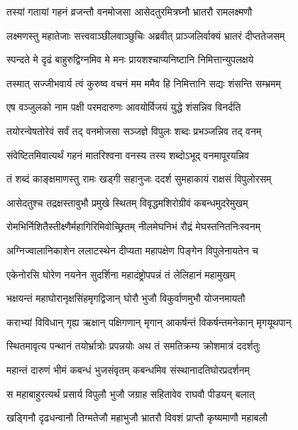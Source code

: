 \twolineshloka
{तस्यां गतायां गहनं व्रजन्तौ वनमोजसा}
{आसेदतुरमित्रघ्नौ भ्रातरौ रामलक्ष्मणौ} %

\twolineshloka
{लक्ष्मणस्तु महातेजाः सत्त्ववाञ्छीलवाञ्छुचिः}
{अब्रवीत् प्राञ्जलिर्वाक्यं भ्रातरं दीप्ततेजसम्} %

\twolineshloka
{स्पन्दते मे दृढं बाहुरुद्विग्नमिव मे मनः}
{प्रायशश्चाप्यनिष्टानि निमित्तान्युपलक्षये} %

\twolineshloka
{तस्मात् सज्जीभवार्य त्वं कुरुष्व वचनं मम}
{ममैव हि निमित्तानि सद्यः शंसन्ति सम्भ्रमम्} %

\twolineshloka
{एष वञ्जुलको नाम पक्षी परमदारुणः}
{आवयोर्विजयं युद्धे शंसन्निव विनर्दति} %

\twolineshloka
{तयोरन्वेषतोरेवं सर्वं तद् वनमोजसा}
{सञ्जज्ञे विपुलः शब्दः प्रभञ्जन्निव तद् वनम्} %

\twolineshloka
{संवेष्टितमिवात्यर्थं गहनं मातरिश्वना}
{वनस्य तस्य शब्दोऽभूद् वनमापूरयन्निव} %

\twolineshloka
{तं शब्दं काङ्क्षमाणस्तु रामः खड्गी सहानुजः}
{ददर्श सुमहाकायं राक्षसं विपुलोरसम्} %

\twolineshloka
{आसेदतुश्च तद्रक्षस्तावुभौ प्रमुखे स्थितम्}
{विवृद्धमशिरोग्रीवं कबन्धमुदरेमुखम्} %

\twolineshloka
{रोमभिर्निशितैस्तीक्ष्णैर्महागिरिमिवोच्छ्रितम्}
{नीलमेघनिभं रौद्रं मेघस्तनितनिःस्वनम्} %

\twolineshloka
{अग्निज्वालानिकाशेन ललाटस्थेन दीप्यता}
{महापक्षेण पिङ्गेन विपुलेनायतेन च} %

\twolineshloka
{एकेनोरसि घोरेण नयनेन सुदर्शिना}
{महादंष्ट्रोपपन्नं तं लेलिहानं महामुखम्} %

\twolineshloka
{भक्षयन्तं महाघोरानृक्षसिंहमृगद्विजान्}
{घोरौ भुजौ विकुर्वाणमुभौ योजनमायतौ} %

\twolineshloka
{कराभ्यां विविधान् गृह्य ऋक्षान् पक्षिगणान् मृगान्}
{आकर्षन्तं विकर्षन्तमनेकान् मृगयूथपान्} %

\twolineshloka
{स्थितमावृत्य पन्थानं तयोर्भ्रात्रोः प्रपन्नयोः}
{अथ तं समतिक्रम्य क्रोशमात्रं ददर्शतुः} %

\twolineshloka
{महान्तं दारुणं भीमं कबन्धं भुजसंवृतम्}
{कबन्धमिव संस्थानादतिघोरप्रदर्शनम्} %

\twolineshloka
{स महाबाहुरत्यर्थं प्रसार्य विपुलौ भुजौ}
{जग्राह सहितावेव राघवौ पीडयन् बलात्} %

\twolineshloka
{खड्गिनौ दृढधन्वानौ तिग्मतेजौ महाभुजौ}
{भ्रातरौ विवशं प्राप्तौ कृष्यमाणौ महाबलौ} %

